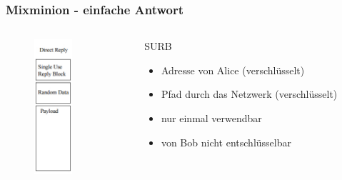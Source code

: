 \documentclass{beamer}
\begin{document}
\begin{frame}
	\frametitle{Mixminion - einfache Antwort}

	\begin{columns}[T]
		\begin{column}{3cm}
			\begin{figure}
				\centering
				\includegraphics[height=5cm]{bilder/mixminion_reply.jpg}
			\end{figure}
		\end{column}
		\begin{column}{7cm}
			\vspace{1cm}
			\begin{block}{SURB}	
				\begin{itemize}	
					\item Adresse von Alice (verschlüsselt)
					\item Pfad durch das Netzwerk (verschlüsselt)
					\item nur einmal verwendbar
					\item von Bob nicht entschlüsselbar
				\end{itemize}
			\end{block}
		\end{column}
	\end{columns}
\end{frame}
\end{document}
